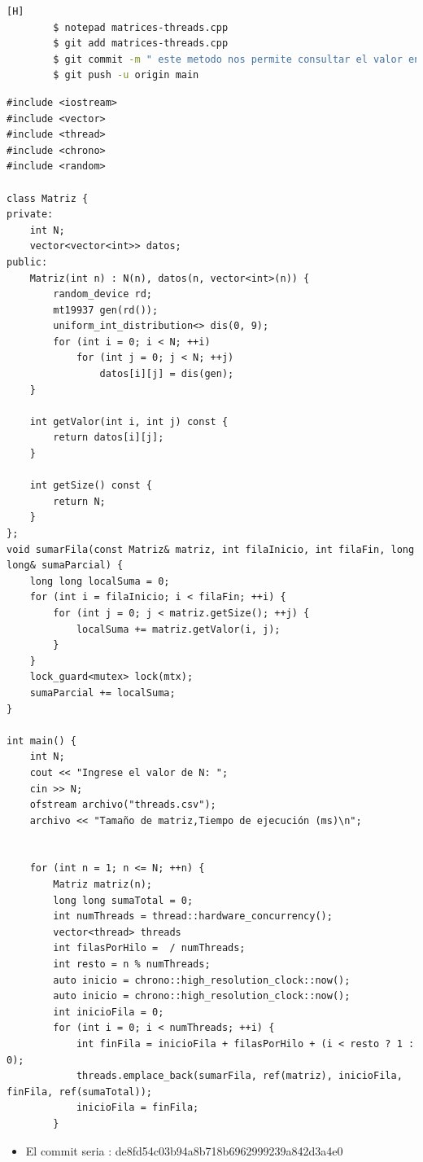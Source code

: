 \documentclass{article}
\begin{document}
  	\begin{lstlisting}[language=bash,caption={Actualisamos matrices-threads.cpp }][H]
		$ notepad matrices-threads.cpp
		$ git add matrices-threads.cpp
		$ git commit -m " este metodo nos permite consultar el valor en la posicion de la matriz"
		$ git push -u origin main
	\end{lstlisting}
  	\begin{lstlisting}
#include <iostream>
#include <vector>
#include <thread>
#include <chrono>
#include <random>

class Matriz {
private:
    int N;
    vector<vector<int>> datos;
public:
    Matriz(int n) : N(n), datos(n, vector<int>(n)) {
        random_device rd;
        mt19937 gen(rd());
        uniform_int_distribution<> dis(0, 9);
        for (int i = 0; i < N; ++i)
            for (int j = 0; j < N; ++j)
                datos[i][j] = dis(gen);
    }

    int getValor(int i, int j) const {
        return datos[i][j];
    }

    int getSize() const {
        return N;
    }
};
void sumarFila(const Matriz& matriz, int filaInicio, int filaFin, long long& sumaParcial) {
    long long localSuma = 0;
    for (int i = filaInicio; i < filaFin; ++i) {
        for (int j = 0; j < matriz.getSize(); ++j) {
            localSuma += matriz.getValor(i, j);
        }
    }
    lock_guard<mutex> lock(mtx);
    sumaParcial += localSuma;
}

int main() {
    int N;
    cout << "Ingrese el valor de N: ";
    cin >> N;
    ofstream archivo("threads.csv");
    archivo << "Tamaño de matriz,Tiempo de ejecución (ms)\n";


    for (int n = 1; n <= N; ++n) {
        Matriz matriz(n);
        long long sumaTotal = 0;
        int numThreads = thread::hardware_concurrency();
        vector<thread> threads
        int filasPorHilo =  / numThreads;
        int resto = n % numThreads;
        auto inicio = chrono::high_resolution_clock::now();
        auto inicio = chrono::high_resolution_clock::now();
        int inicioFila = 0;
        for (int i = 0; i < numThreads; ++i) {
            int finFila = inicioFila + filasPorHilo + (i < resto ? 1 : 0);
            threads.emplace_back(sumarFila, ref(matriz), inicioFila, finFila, ref(sumaTotal));
            inicioFila = finFila;
        }
	\end{lstlisting}
	\begin{itemize}	
		\item El commit seria : de8fd54c03b94a8b718b6962999239a842d3a4e0
	\end{itemize}	
 
\end{document}
